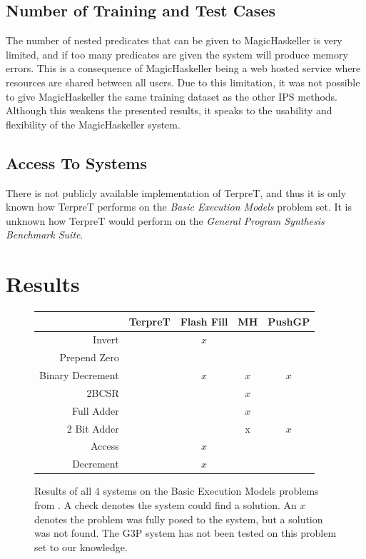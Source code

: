 \subsection{Number of Training and Test Cases}

The number of nested predicates that can be given to MagicHaskeller is very limited, and if too many predicates are given the system will produce memory errors. This is a consequence of MagicHaskeller being a web hosted service where resources are shared between all users. Due to this limitation, it was not possible to give MagicHaskeller the same training dataset as the other IPS methods. Although this weakens the presented results, it speaks to the usability and flexibility of the MagicHaskeller system.

\subsection{Access To Systems}

There is not publicly available implementation of TerpreT, and thus it is only known how TerpreT performs on the \emph{Basic Execution Models} problem set. It is unknown how TerpreT would perform on the \emph{General Program Synthesis Benchmark Suite}.


\section{Results}


\begin{figure}
\begin{tabular}{ r | c c c c }
	& TerpreT & Flash Fill & MH & PushGP \\
	\hline
	Invert & \checkmark & $x$ & \checkmark & \checkmark \\
	Prepend Zero & \checkmark & \checkmark & \checkmark & \checkmark \\
	Binary Decrement & \checkmark & $x$ & $x$ & $x$ \\
	2BCSR & \checkmark &  & $x$ & \checkmark \\
	Full Adder & \checkmark &  & $x$ & \checkmark \\
	2 Bit Adder & \checkmark &  & x & $x$ \\
	Access & \checkmark & $x$ & \checkmark & \checkmark \\
	Decrement & \checkmark & $x$ & \checkmark & \checkmark \\
\end{tabular}
\caption{Results of all 4 systems on the Basic Execution Models problems from \cite{Gaunt2016}.  A check denotes the system could find a solution. An $x$ denotes the problem was fully posed to the system, but a solution was not found. The G3P system has not been tested on this problem set to our knowledge.}
\label{fig:results1}
\end{figure}

